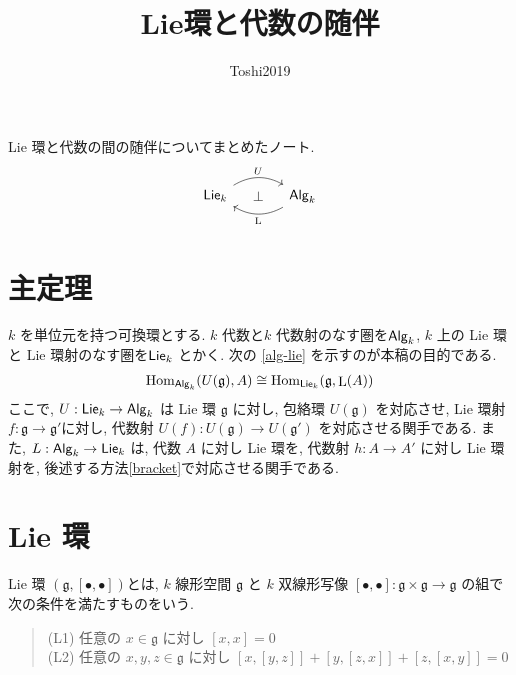 \documentclass[12pt, a4paper, dvipdfmx]{jsarticle}
\title{Lie環と代数の随伴}
\author{Toshi2019}
\date{}
\theoremstyle{definition}
\numberwithin{equation}{section} %
\newcommand{\Hom}{\mathop{\mathrm{Hom}}\nolimits}
\newcommand{\gG}{\mathfrak{g}}
\newcommand{\lL}{\mathop{\mathrm{L}}\nolimits}
\newcommand{\cat}[1]{\textup{\textsf{#1}}}%
\begin{document}
\maketitle

Lie 環と代数の間の随伴についてまとめたノート. 
\[
\begin{tikzcd}[column sep=large]
\cat{Lie}_k 
\arrow[r, bend left, "U"] 
\arrow[r, phantom, "\perp"]  
&
\cat{Alg}_k 
\arrow[l, bend left, "\lL"]
\end{tikzcd}\label{adj-}
\]

\begin{comment}
\begin{equation}
    \begin{tikzcd}
    \cat{C}
    \arrow[r, bend left, "F"] 
    \arrow[r, phantom, "\perp"] 
    & 
    \cat{C}' \arrow[l, bend left, "G"]
    \end{tikzcd}
\end{equation}
\end{comment}


\section{主定理}

$k$ を単位元を持つ可換環とする. 
$k$ 代数と$k$ 代数射のなす圏を$\cat{Alg}_k$, 
$k$ 上の Lie 環と Lie 環射のなす圏を$\cat{Lie}_k$
とかく. 
次の \eqref{alg-lie} を示すのが本稿の目的である. 
\begin{align}
    \Hom_{\cat{Alg}_k}(U(\gG),A)
    \cong
    \Hom_{\cat{Lie}_k}(\gG,\lL(A)) \label{alg-lie}
\end{align}
ここで, 
$U: \cat{Lie}_k\to\cat{Alg}_k$ 
は Lie 環 $\gG$ に対し, 
包絡環 $U(\gG)$ を対応させ, 
Lie 環射 $f: \gG \to \gG'$に対し, 
代数射 $U(f): U(\gG) \to U(\gG')$ 
を対応させる関手である. 
また, 
$L: \cat{Alg}_k \to \cat{Lie}_k$
は, 代数 $A$ に対し Lie 環を, 
代数射 $h: A\to A'$ に対し 
Lie 環射を, 後述する方法\eqref{bracket}で対応させる関手である. 

\section{Lie 環}

Lie 環 $(\gG, [\bullet,\bullet])$とは, 
$k$ 線形空間 $\gG$ と $k$ 双線形写像
$[\bullet,\bullet]: \gG\times\gG\to\gG$
の組で次の条件を満たすものをいう. 

\begin{quote}
    (L1) 任意の $x\in \gG$ に対し $[x,x] = 0$\\
    (L2) 任意の $x,y,z\in \gG$ に対し 
    $[x,[y,z]] + [y,[z,x]] + [z,[x,y]] = 0$
\end{quote}
\end{document}
